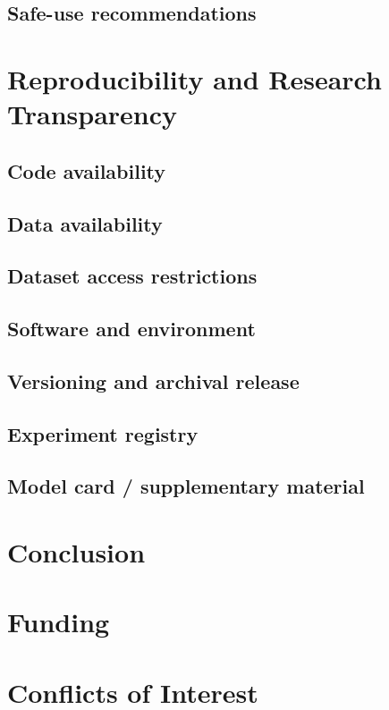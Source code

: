 \documentclass[10pt,journal]{IEEEtran}
\begin{document}
\subsection{Safe-use recommendations}

\section{Reproducibility and Research Transparency}
\subsection{Code availability}
\subsection{Data availability}
\subsection{Dataset access restrictions}
\subsection{Software and environment}
\subsection{Versioning and archival release}
\subsection{Experiment registry}
\subsection{Model card / supplementary material}

\section{Conclusion}

\section*{Funding}

\section*{Conflicts of Interest}
\end{document}
